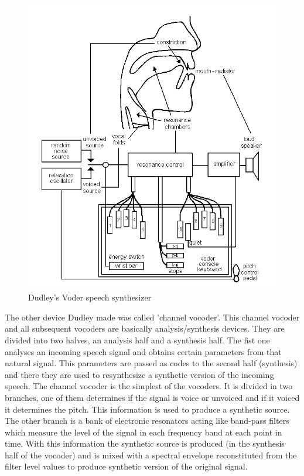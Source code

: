 \begin{figure}[htb]
	\begin{center}
	\includegraphics[width=1\textwidth]{img/voder.png}
	\end{center}
	\caption{\label{voder}Dudley's Voder speech synthesizer \cite{history-images}}
\end{figure}
The other device Dudley made was called 'channel vocoder'. This channel vocoder and all subsequent vocoders are basically analysis/synthesis devices. They are divided into two halves, an analysis half and a synthesis half. The fist one analyses an incoming speech signal and obtains certain parameters from that natural signal. This parameters are passed as codes to the second half (synthesis) and there they are used to resynthesize a synthetic version of the incoming speech. The channel vocoder is the simplest of the vocoders. It is divided in two branches, one of them determines if the signal is voice or unvoiced and if it voiced it determines the pitch. This information is used to produce a synthetic source. The other branch is a bank of electronic resonators acting like band-pass filters which measure the level of the signal in each frequency band at each point in time. With this information the synthetic source is produced (in the synthesis half of the vocoder) and is mixed with a spectral envelope reconstituted from the filter level values to produce synthetic version of the original signal.\\
